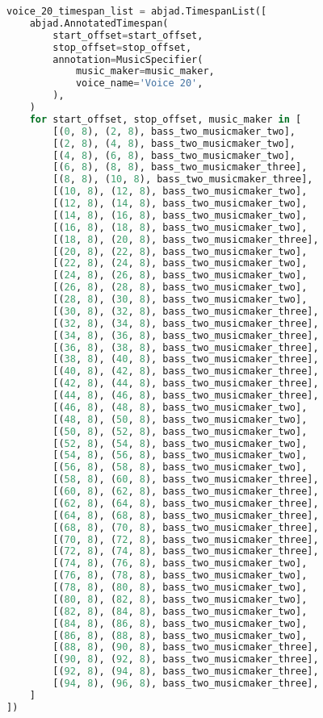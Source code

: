\begin{lstlisting}[language=Python, caption=Invocation Source Code]
voice_20_timespan_list = abjad.TimespanList([
    abjad.AnnotatedTimespan(
        start_offset=start_offset,
        stop_offset=stop_offset,
        annotation=MusicSpecifier(
            music_maker=music_maker,
            voice_name='Voice 20',
        ),
    )
    for start_offset, stop_offset, music_maker in [
        [(0, 8), (2, 8), bass_two_musicmaker_two],
        [(2, 8), (4, 8), bass_two_musicmaker_two],
        [(4, 8), (6, 8), bass_two_musicmaker_two],
        [(6, 8), (8, 8), bass_two_musicmaker_three],
        [(8, 8), (10, 8), bass_two_musicmaker_three],
        [(10, 8), (12, 8), bass_two_musicmaker_two],
        [(12, 8), (14, 8), bass_two_musicmaker_two],
        [(14, 8), (16, 8), bass_two_musicmaker_two],
        [(16, 8), (18, 8), bass_two_musicmaker_two],
        [(18, 8), (20, 8), bass_two_musicmaker_three],
        [(20, 8), (22, 8), bass_two_musicmaker_two],
        [(22, 8), (24, 8), bass_two_musicmaker_two],
        [(24, 8), (26, 8), bass_two_musicmaker_two],
        [(26, 8), (28, 8), bass_two_musicmaker_two],
        [(28, 8), (30, 8), bass_two_musicmaker_two],
        [(30, 8), (32, 8), bass_two_musicmaker_three],
        [(32, 8), (34, 8), bass_two_musicmaker_three],
        [(34, 8), (36, 8), bass_two_musicmaker_three],
        [(36, 8), (38, 8), bass_two_musicmaker_three],
        [(38, 8), (40, 8), bass_two_musicmaker_three],
        [(40, 8), (42, 8), bass_two_musicmaker_three],
        [(42, 8), (44, 8), bass_two_musicmaker_three],
        [(44, 8), (46, 8), bass_two_musicmaker_three],
        [(46, 8), (48, 8), bass_two_musicmaker_two],
        [(48, 8), (50, 8), bass_two_musicmaker_two],
        [(50, 8), (52, 8), bass_two_musicmaker_two],
        [(52, 8), (54, 8), bass_two_musicmaker_two],
        [(54, 8), (56, 8), bass_two_musicmaker_two],
        [(56, 8), (58, 8), bass_two_musicmaker_two],
        [(58, 8), (60, 8), bass_two_musicmaker_three],
        [(60, 8), (62, 8), bass_two_musicmaker_three],
        [(62, 8), (64, 8), bass_two_musicmaker_three],
        [(64, 8), (68, 8), bass_two_musicmaker_three],
        [(68, 8), (70, 8), bass_two_musicmaker_three],
        [(70, 8), (72, 8), bass_two_musicmaker_three],
        [(72, 8), (74, 8), bass_two_musicmaker_three],
        [(74, 8), (76, 8), bass_two_musicmaker_two],
        [(76, 8), (78, 8), bass_two_musicmaker_two],
        [(78, 8), (80, 8), bass_two_musicmaker_two],
        [(80, 8), (82, 8), bass_two_musicmaker_two],
        [(82, 8), (84, 8), bass_two_musicmaker_two],
        [(84, 8), (86, 8), bass_two_musicmaker_two],
        [(86, 8), (88, 8), bass_two_musicmaker_two],
        [(88, 8), (90, 8), bass_two_musicmaker_three],
        [(90, 8), (92, 8), bass_two_musicmaker_three],
        [(92, 8), (94, 8), bass_two_musicmaker_three],
        [(94, 8), (96, 8), bass_two_musicmaker_three],
    ]
])


\end{lstlisting}
